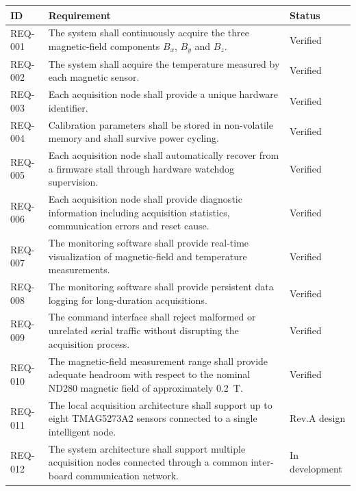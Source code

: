 \begin{longtable}{p{18mm}p{106mm}p{23mm}}
	\toprule
	ID & Requirement & Status \\
	\midrule
	
	REQ-001 &
	The system shall continuously acquire the three magnetic-field components $B_x$, $B_y$ and $B_z$. &
	Verified \\
	
	REQ-002 &
	The system shall acquire the temperature measured by each magnetic sensor. &
	Verified \\
	
	REQ-003 &
	Each acquisition node shall provide a unique hardware identifier. &
	Verified \\
	
	REQ-004 &
	Calibration parameters shall be stored in non-volatile memory and shall survive power cycling. &
	Verified \\
	
	REQ-005 &
	Each acquisition node shall automatically recover from a firmware stall through hardware watchdog supervision. &
	Verified \\
	
	REQ-006 &
	Each acquisition node shall provide diagnostic information including acquisition statistics, communication errors and reset cause. &
	Verified \\
	
	REQ-007 &
	The monitoring software shall provide real-time visualization of magnetic-field and temperature measurements. &
	Verified \\
	
	REQ-008 &
	The monitoring software shall provide persistent data logging for long-duration acquisitions. &
	Verified \\
	
	REQ-009 &
	The command interface shall reject malformed or unrelated serial traffic without disrupting the acquisition process. &
	Verified \\
	
	REQ-010 &
	The magnetic-field measurement range shall provide adequate headroom with respect to the nominal ND280 magnetic field of approximately \SI{0.2}{T}. &
	Verified \\
	
	REQ-011 &
	The local acquisition architecture shall support up to eight TMAG5273A2 sensors connected to a single intelligent node. &
	Rev.A design \\
	
	REQ-012 &
	The system architecture shall support multiple acquisition nodes connected through a common inter-board communication network. &
	In development \\
	

\end{longtable}
